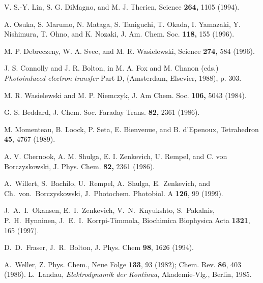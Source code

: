 \documentclass[12pt,twoside,a4paper]{report}
\begin{document}
{\begin{thebibliography}{999}
  V. S.-Y. Lin, S. G. DiMagno, and M. J. Therien, Science  
\textbf{264,} 1105 (1994). 
 
  A. Osuka, S. Marumo, N. Mataga, S. Taniguchi, T. Okada, 
I. Yamazaki, Y. Nishimura, T. Ohno, and K. Nozaki, J. Am. Chem. Soc. \textbf{%
118,} 155 (1996). 
 
  M. P. Debreczeny, W. A. Svec, and M. R. Wasielewski, 
Science \textbf{274,} 584 (1996). 
 
  J. S. Connolly and J. R. Bolton, 
in M. A. Fox and M. Chanon (eds.) {\it Photoinduced electron transfer} 
Part D, (Amsterdam, Elsevier, 1988), p. 303. 
 
  M. R. Wasielewski and M. P. Niemczyk, J. Am Chem. Soc.  
\textbf{106,} 5043 (1984). 
 
  G. S. Beddard, J. Chem. Soc. Faraday Trans.  
\textbf{82,} 2361 (1986). 
 
  M. Momenteau, B. Loock, P. Seta, E. Bienvenue, and B. 
d'Epenoux, {Tetrahedron } {\bf 45}, 4767 (1989). 
 
  A. V. Chernook, A. M. Shulga, E. I. Zenkevich, U. Rempel, 
and C. von Borczyskowski, J. Phys. Chem. \textbf{82,} 2361 (1986). 


 A.~Willert, S.~Bachilo, U.~Rempel, A.~Shulga,
                 E.~Zenkevich, and Ch.~von.~Borczyskowski,
                 J.~Photochem. Photobiol. A {\bf 126}, 99 (1999).

 J.~A.~I.~Okansen, E.~I.~Zenkevich, V.~N.~Knyukshto,
               S.~Pakalnis, P.~H.~Hynninen, J.~E.~I.~Korrpi-Timmola,
               Biochimica Biophysica Acta {\bf 1321}, 165 (1997). 


 D.~D.~Fraser, J.~R.~Bolton, J. Phys. Chem {\bf 98}, 1626 (1994).

 A.~Weller, Z. Phys. Chem., Neue Folge {\bf 133}, 93 (1982); Chem. Rev. {\bf 86}, 403 (1986).
  L.~Landau, {\it Elektrodynamik der Kontinua}, Akademie-Vlg., Berlin, 1985.


 
 

\end{thebibliography}}
\end{document}
